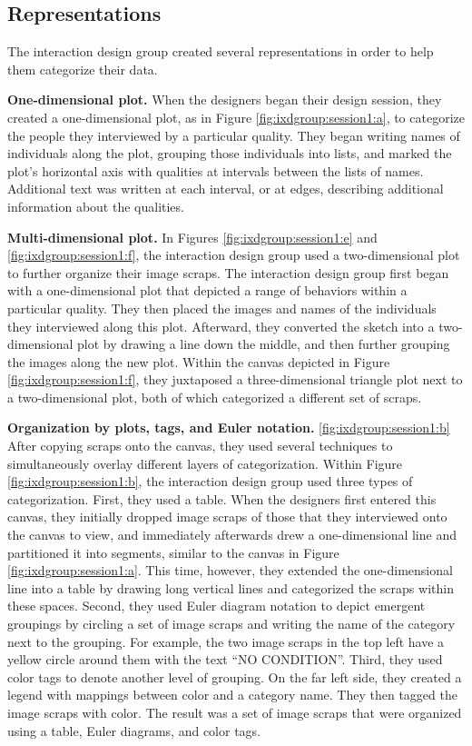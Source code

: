\subsection{Representations}

The interaction design group created several representations in order to help them categorize their data. 

\textbf{One-dimensional plot.} When the designers began their design session, they created a one-dimensional plot, as in Figure \ref{fig:ixdgroup:session1:a}, to categorize the people they interviewed by a particular quality. They began writing names of individuals along the plot, grouping those individuals into lists, and marked the plot's horizontal axis with qualities at intervals between the lists of names. Additional text was written at each interval, or at edges, describing additional information about the qualities.

\textbf{Multi-dimensional plot.} In Figures \ref{fig:ixdgroup:session1:e} and \ref{fig:ixdgroup:session1:f}, the interaction design group used a two-dimensional plot to further organize their image scraps. The interaction design group first began with a one-dimensional plot that depicted a range of behaviors within a particular quality. They then placed the images and names of the individuals they interviewed along this plot. Afterward, they converted the sketch into a two-dimensional plot by drawing a line down the middle, and then further grouping the images along the new plot. Within the canvas depicted in Figure \ref{fig:ixdgroup:session1:f}, they juxtaposed a three-dimensional triangle plot next to a two-dimensional plot, both of which categorized a different set of scraps.

\textbf{Organization by plots, tags, and Euler notation.} \ref{fig:ixdgroup:session1:b} After copying scraps onto the canvas, they used several techniques to simultaneously overlay  different layers of categorization. Within Figure \ref{fig:ixdgroup:session1:b}, the interaction design group used three types of categorization. First, they used a table. When the designers first entered this canvas, they initially dropped image scraps of those that they interviewed onto the canvas to view, and immediately afterwards drew a one-dimensional line and partitioned it into segments, similar to the canvas in Figure \ref{fig:ixdgroup:session1:a}. This time, however, they extended the one-dimensional line into a table by drawing long vertical lines and categorized the scraps within these spaces. Second, they used Euler diagram notation to depict emergent groupings by circling a set of image scraps and writing the name of the category next to the grouping. For example, the two image scraps in the top left have a yellow circle around them with the text ``NO CONDITION''. Third, they used color tags to denote another level of grouping. On the far left side, they created a legend with mappings between color and a category name. They then tagged the image scraps with color. The result was a set of image scraps that were organized using a table, Euler diagrams, and color tags.

